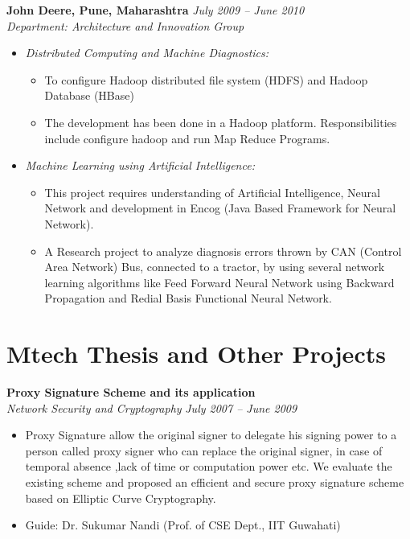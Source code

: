 \documentclass[margin,line]{resume}
\begin{document}
\begin{resume}
    \textbf{John Deere, Pune, Maharashtra }\hfill \textsl{July 2009 -- June 2010}\vspace{0mm}\\\vspace{0mm}%
    \textsl{Department: Architecture and Innovation Group} 
     \begin{itemize}
     \item \textsl{Distributed Computing and Machine Diagnostics:} 
            \begin{itemize}
             \item To configure Hadoop distributed file system (HDFS) and Hadoop Database (HBase)
             \item The development has been done in a Hadoop platform. Responsibilities include configure hadoop and run Map Reduce Programs.
             \end{itemize}
     \item \textsl{Machine Learning using Artificial Intelligence:}
             \begin{itemize}
              \item This project requires understanding of Artificial Intelligence, Neural Network and development in Encog (Java Based Framework for Neural Network).
	       \item A Research project to analyze diagnosis errors thrown by CAN (Control Area  Network) Bus,
   connected to a tractor, by using several network learning algorithms like Feed Forward Neural Network using Backward Propagation and Redial Basis Functional Neural Network.
               \end{itemize}
      \end{itemize}
    \section{\mysidestyle Mtech Thesis and Other Projects}

    \textbf{Proxy Signature Scheme and its application}\vspace{0mm}\\\vspace{0mm}%
    \textsl{Network Security and Cryptography}  \hfill \textsl{July 2007 -- June 2009}
       \begin{itemize}
	\item Proxy Signature allow the original signer to delegate his signing power to a person 
         called proxy signer  who can replace the original signer, in case of temporal absence ,lack of time or computation power etc.
        We evaluate the existing scheme and proposed an efficient and secure proxy signature scheme based on Elliptic Curve 
        Cryptography. 
	\item Guide: Dr. Sukumar Nandi (Prof. of CSE Dept., IIT Guwahati)
       \end{itemize}
       

\end{resume}
\end{document}
